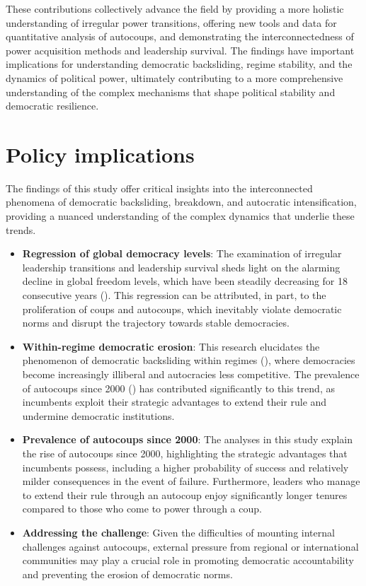 \documentclass[
  12pt,
]{report}
\begin{document}
These contributions collectively advance the field by providing a more
holistic understanding of irregular power transitions, offering new
tools and data for quantitative analysis of autocoups, and demonstrating
the interconnectedness of power acquisition methods and leadership
survival. The findings have important implications for understanding
democratic backsliding, regime stability, and the dynamics of political
power, ultimately contributing to a more comprehensive understanding of
the complex mechanisms that shape political stability and democratic
resilience.

\section{Policy implications}\label{policy-implications}

The findings of this study offer critical insights into the
interconnected phenomena of democratic backsliding, breakdown, and
autocratic intensification, providing a nuanced understanding of the
complex dynamics that underlie these trends.

\begin{itemize}
\item
  \textbf{Regression of global democracy levels}: The examination of
  irregular leadership transitions and leadership survival sheds light
  on the alarming decline in global freedom levels, which have been
  steadily decreasing for 18 consecutive years
  (). This
  regression can be attributed, in part, to the proliferation of coups
  and autocoups, which inevitably violate democratic norms and disrupt
  the trajectory towards stable democracies.
\item
  \textbf{Within-regime democratic erosion}: This research elucidates
  the phenomenon of democratic backsliding within regimes
  (),
  where democracies become increasingly illiberal and autocracies less
  competitive. The prevalence of autocoups since 2000
  () has contributed significantly
  to this trend, as incumbents exploit their strategic advantages to
  extend their rule and undermine democratic institutions.
\item
  \textbf{Prevalence of autocoups since 2000}: The analyses in this
  study explain the rise of autocoups since 2000, highlighting the
  strategic advantages that incumbents possess, including a higher
  probability of success and relatively milder consequences in the event
  of failure. Furthermore, leaders who manage to extend their rule
  through an autocoup enjoy significantly longer tenures compared to
  those who come to power through a coup.
\item
  \textbf{Addressing the challenge}: Given the difficulties of mounting
  internal challenges against autocoups, external pressure from regional
  or international communities may play a crucial role in promoting
  democratic accountability and preventing the erosion of democratic
  norms.
\end{itemize}
\end{document}
